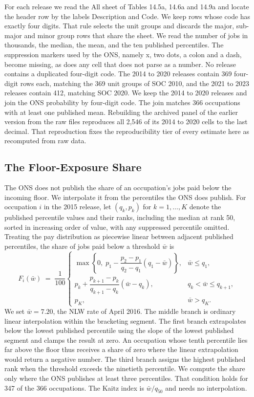 \documentclass[12pt,leqno]{article}
\begin{document}
For each release we read the All sheet of Tables 14.5a, 14.6a and 14.9a and locate the header row by the labels Description and Code. We keep rows whose code has exactly four digits. That rule selects the unit groups and discards the major, sub-major and minor group rows that share the sheet. We read the number of jobs in thousands, the median, the mean, and the ten published percentiles. The suppression markers used by the ONS, namely x, two dots, a colon and a dash, become missing, as does any cell that does not parse as a number. No release contains a duplicated four-digit code. The 2014 to 2020 releases contain 369 four-digit rows each, matching the 369 unit groups of SOC 2010, and the 2021 to 2023 releases contain 412, matching SOC 2020. We keep the 2014 to 2020 releases and join the ONS probability by four-digit code. The join matches 366 occupations with at least one published mean. Rebuilding the archived panel of the earlier version from the raw files reproduces all 2,546 of its 2014 to 2020 cells to the last decimal. That reproduction fixes the reproducibility tier of every estimate here as recomputed from raw data.

\subsection{The Floor-Exposure Share}

The ONS does not publish the share of an occupation's jobs paid below the incoming floor. We interpolate it from the percentiles the ONS does publish. For occupation $i$ in the 2015 release, let $(q_k, p_k)$ for $k = 1, \dots, K$ denote the published percentile values and their ranks, including the median at rank 50, sorted in increasing order of value, with any suppressed percentile omitted. Treating the pay distribution as piecewise linear between adjacent published percentiles, the share of jobs paid below a threshold $\bar{w}$ is
\begin{equation}\label{eq:share}
F_i(\bar{w}) \;=\; \frac{1}{100}
\begin{cases}
\max\!\left\{0,\; p_1 - \dfrac{p_2 - p_1}{q_2 - q_1}\left(q_1 - \bar{w}\right)\right\}, & \bar{w} \leq q_1, \\[14pt]
p_k + \dfrac{p_{k+1} - p_k}{q_{k+1} - q_k}\left(\bar{w} - q_k\right), & q_k < \bar{w} \leq q_{k+1}, \\[14pt]
p_K, & \bar{w} > q_K .
\end{cases}
\end{equation}
We set $\bar{w} = 7.20$, the NLW rate of April 2016. The middle branch is ordinary linear interpolation within the bracketing segment. The first branch extrapolates below the lowest published percentile using the slope of the lowest published segment and clamps the result at zero. An occupation whose tenth percentile lies far above the floor thus receives a share of zero where the linear extrapolation would return a negative number. The third branch assigns the highest published rank when the threshold exceeds the ninetieth percentile. We compute the share only where the ONS publishes at least three percentiles. That condition holds for 347 of the 366 occupations. The Kaitz index is $\bar{w} / q_{50}$ and needs no interpolation.
\end{document}

